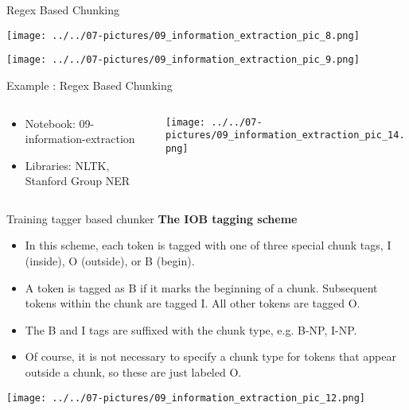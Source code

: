 \documentclass[11pt]{beamer}
\begin{document}
\begin{frame}{Regex Based Chunking}
	\begin{center}
	\texttt{[image: ../../07-pictures/09\_information\_extraction\_pic\_8.png]}
	\end{center}
	\begin{center}
	\texttt{[image: ../../07-pictures/09\_information\_extraction\_pic\_9.png]}
	\end{center}
\end{frame}
\begin{frame}{Example : Regex Based Chunking}
\begin{columns}[T] %
\begin{column}{.48\textwidth}
        \begin{itemize}
		\item Notebook: 09-information-extraction
		\item Libraries: NLTK, Stanford Group NER
        \end{itemize}
\end{column}%
\hfill%
\begin{column}{.48\textwidth}
        \texttt{[image: ../../07-pictures/09\_information\_extraction\_pic\_14.png]}
\end{column}%
\end{columns}
\end{frame}
\begin{frame}{Training tagger based chunker}
\textbf{The IOB tagging scheme}
	\begin{itemize}
		\item In this scheme, each token is tagged with one of three special chunk tags, I (inside), O (outside), or B (begin). 
		\item A token is tagged as B if it marks the beginning of a chunk. Subsequent tokens within the chunk are tagged I. All other tokens are tagged O. 
		\item The B and I tags are suffixed with the chunk type, e.g. B-NP, I-NP. 
		\item Of course, it is not necessary to specify a chunk type for tokens that appear outside a chunk, so these are just labeled O.
	\end{itemize}
	\begin{center}
	\texttt{[image: ../../07-pictures/09\_information\_extraction\_pic\_12.png]}
	\end{center}
\end{frame}
\end{document}
